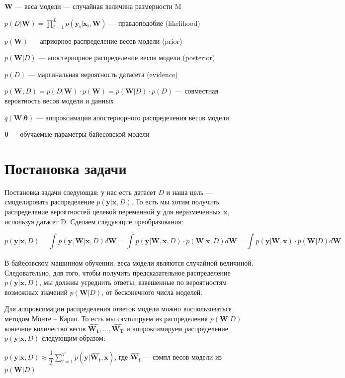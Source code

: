 \documentclass{article}
\begin{document}
$\mathbf{W}$ --- веса модели --- случайная величина размерности M

$p(D | \mathbf{W}) = \prod_{i=1}^{L} p(\mathbf{y_i} | \mathbf{x_i}, \mathbf{W})$ — правдоподобие (likelihood)

$p(\mathbf{W})$ --- априорное распределение весов модели (prior)

$p(\mathbf{W}| D)$ --- апостериорное распределение весов модели (posterior)

$p(D)$ --- маргинальная вероятность датасета (evidence)

$p(\mathbf{W}, D) =
p(D | \mathbf{W}) \cdot p(\mathbf{W}) =
p(\mathbf{W}| D)\cdot p(D)$
--- совместная вероятность весов модели и данных

$q(\mathbf{W} | \pmb{\theta})$ --- аппроксимация апостериорного распределения весов модели

$\pmb{\theta}$ --- обучаемые параметры байесовской модели

\section{Постановка задачи}
Постановка задачи следующая: у нас есть датасет $D$ и наша цель — смоделировать распределение $p(\mathbf{y} | \mathbf{x}, D)$. То есть мы хотим получить распределение вероятностей целевой переменной $\mathbf{y}$ для неразмеченных $\mathbf{x}$, используя датасет D. Сделаем следующие преобразования:

\[
p(\mathbf{y} | \mathbf{x}, D) =
\int_{}{} p(\mathbf{y}, \mathbf{W} | \mathbf{x}, D) d\mathbf{W} =
\int_{}{} p(\mathbf{y} | \mathbf{W}, \mathbf{x}, D) \cdot p(\mathbf{W} | \mathbf{x}, D) d\mathbf{W} =
\int_{}{} p(\mathbf{y} | \mathbf{W}, \mathbf{x}) \cdot p(\mathbf{W} | D) d\mathbf{W}
\]

В байесовском машинном обучении, веса модели являются случайной величиной. Следовательно, для того, чтобы получить предсказательное распределение $p(\mathbf{y} | \mathbf{x}, D)$, мы должны усреднить ответы, взвешенные по вероятностям возможных значений $p(\mathbf{W} | D)$, от бесконечного числа моделей.

Для аппроксимации распределения ответов модели можно воспользоваться методом Монте -- Карло. То есть мы сэмплируем из распределения $p(\mathbf{W}| D)$ конечное количество весов $\hat{\mathbf{W_1}}, \dots, \hat{\mathbf{W_T}}$ и аппроксимируем распределение $p(\mathbf{y} | \mathbf{x}, D)$ следующим образом:

$
p(\mathbf{y} | \mathbf{x}, D)
\approx \dfrac{1}{T} \sum_{t=1}^{T}{p(\mathbf{y} | \hat{\mathbf{W_t}}, \mathbf{x})}
$, где $\hat{\mathbf{W_t}}$ --- сэмпл весов модели из $p(\mathbf{W}| D)$
\end{document}

